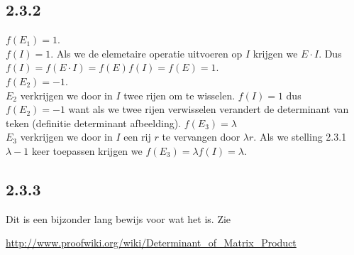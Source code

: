 \documentclass[lineaire_algebra_oplossingen.tex]{subfiles}
\begin{document}
\subsection{2.3.2}
$f(E_1) = 1$.\\
$f(I) = 1$. Als we de elemetaire operatie uitvoeren op $I$ krijgen we $E\cdot I$. Dus $f(I) = f(E\cdot I) = f(E) f(I) = f(E)=1$.\\
$f(E_2)=-1$.\\
$E_2$ verkrijgen we door in $I$ twee rijen om te wisselen. $f(I) = 1$ dus $f(E_2)=-1$ want als we twee rijen verwisselen verandert de determinant van teken (definitie determinant afbeelding).
$f(E_3) = \lambda$\\
$E_3$ verkrijgen we door in $I$ een rij $r$ te vervangen door $\lambda r$. Als we stelling 2.3.1 $\lambda-1$ keer toepassen krijgen we $f(E_3) = \lambda f(I) = \lambda$.
\subsection{2.3.3}
Dit is een bijzonder lang bewijs voor wat het is. Zie 
\begin{center}
\url{http://www.proofwiki.org/wiki/Determinant_of_Matrix_Product}
\end{center}
\end{document}
